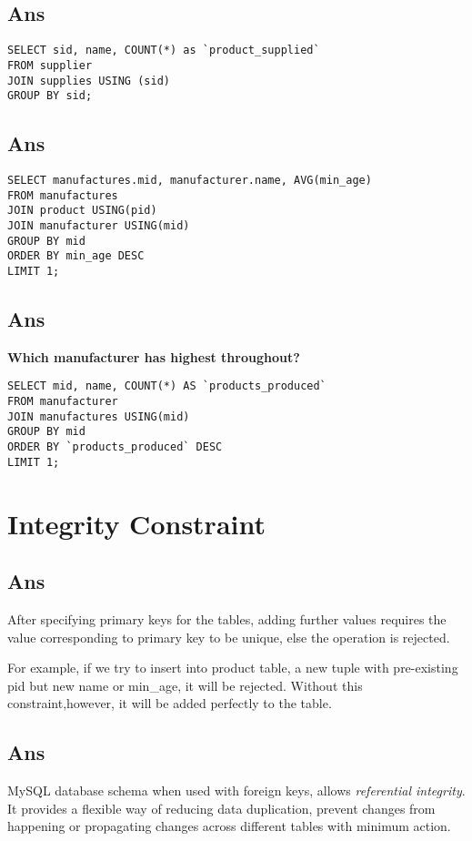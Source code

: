 \documentclass[a4]{article}
\begin{document}
\subsection{Ans}
\begin{lstlisting}
SELECT sid, name, COUNT(*) as `product_supplied`
FROM supplier
JOIN supplies USING (sid)
GROUP BY sid;
\end{lstlisting}

\subsection{Ans}
\begin{lstlisting}
SELECT manufactures.mid, manufacturer.name, AVG(min_age)
FROM manufactures
JOIN product USING(pid)
JOIN manufacturer USING(mid)
GROUP BY mid 
ORDER BY min_age DESC
LIMIT 1;
\end{lstlisting}

\subsection{Ans}
\textbf{Which manufacturer has highest throughout?}
\begin{lstlisting}
SELECT mid, name, COUNT(*) AS `products_produced`
FROM manufacturer
JOIN manufactures USING(mid)
GROUP BY mid
ORDER BY `products_produced` DESC
LIMIT 1;
\end{lstlisting}

\section{Integrity Constraint}

\subsection{Ans}

After specifying primary keys for the tables, adding further values requires 
the value corresponding to primary key to be unique, else the operation is 
rejected.

For example, if we try to insert into \textup{product} table, a new tuple with
pre-existing \textup{pid} but new \textup{name} or \textup{min\_age}, it will 
be 
rejected. Without this constraint,however, it will be added perfectly to the 
table.

\subsection{Ans}
MySQL database schema when used with foreign keys, allows \textit{referential 
integrity}. It provides a flexible way of reducing data duplication, prevent 
changes from happening or propagating changes across different tables with 
minimum action.
\end{document}
